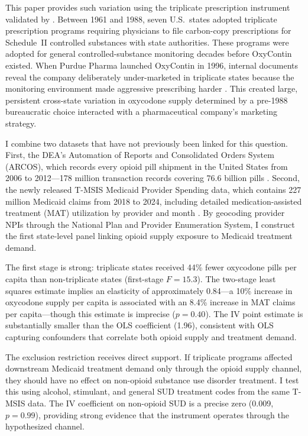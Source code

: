 \documentclass[12pt]{article}
\begin{document}
This paper provides such variation using the triplicate prescription instrument validated by \citet{AlpertPowellPacula2022}. Between 1961 and 1988, seven U.S.\ states adopted triplicate prescription programs requiring physicians to file carbon-copy prescriptions for Schedule~II controlled substances with state authorities. These programs were adopted for general controlled-substance monitoring decades before OxyContin existed. When Purdue Pharma launched OxyContin in 1996, internal documents reveal the company deliberately under-marketed in triplicate states because the monitoring environment made aggressive prescribing harder \citep{VanZee2009}. This created large, persistent cross-state variation in oxycodone supply determined by a pre-1988 bureaucratic choice interacted with a pharmaceutical company's marketing strategy.

I combine two datasets that have not previously been linked for this question. First, the DEA's Automation of Reports and Consolidated Orders System (ARCOS), which records every opioid pill shipment in the United States from 2006 to 2012---178 million transaction records covering 76.6 billion pills \citep{WashingtonPost2019}. Second, the newly released T-MSIS Medicaid Provider Spending data, which contains 227 million Medicaid claims from 2018 to 2024, including detailed medication-assisted treatment (MAT) utilization by provider and month \citep{HHS2026}. By geocoding provider NPIs through the National Plan and Provider Enumeration System, I construct the first state-level panel linking opioid supply exposure to Medicaid treatment demand.

The first stage is strong: triplicate states received 44\% fewer oxycodone pills per capita than non-triplicate states (first-stage $F = 15.3$). The two-stage least squares estimate implies an elasticity of approximately 0.84---a 10\% increase in oxycodone supply per capita is associated with an 8.4\% increase in MAT claims per capita---though this estimate is imprecise ($p = 0.40$). The IV point estimate is substantially smaller than the OLS coefficient (1.96), consistent with OLS capturing confounders that correlate both opioid supply and treatment demand.

The exclusion restriction receives direct support. If triplicate programs affected downstream Medicaid treatment demand only through the opioid supply channel, they should have no effect on non-opioid substance use disorder treatment. I test this using alcohol, stimulant, and general SUD treatment codes from the same T-MSIS data. The IV coefficient on non-opioid SUD is a precise zero (0.009, $p = 0.99$), providing strong evidence that the instrument operates through the hypothesized channel.
\end{document}
